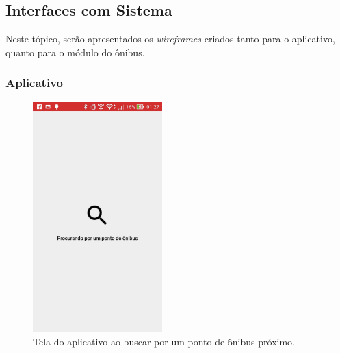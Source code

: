\documentclass[
	12pt,				%
	oneside,			%
	a4paper,			%
	brazil				%
]{abntex2}
\begin{document}
{\newpage

\subsection{Interfaces com Sistema}

Neste tópico, serão apresentados os \textit{wireframes} criados tanto para o aplicativo, quanto para o módulo do ônibus.

\subsubsection{Aplicativo}


\begin{figure}[!h]
\centering
\includegraphics[width=5cm, center]{images/beacon_searching_bus_stop}
\caption{Tela do aplicativo ao buscar por um ponto de ônibus próximo.}
\label{Rotulo}
\end{figure}

}
\end{document}
